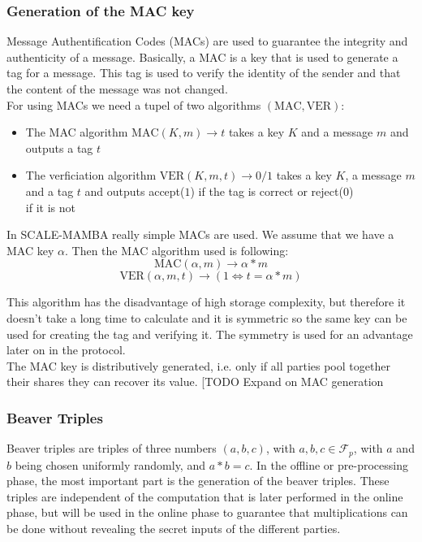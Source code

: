 \documentclass[english,runningheads,a4paper]{llncs}[2018/03/10]
\begin{document}
\subsubsection{Generation of the MAC key}
Message Authentification Codes (MACs) are used to guarantee the integrity and authenticity of a message. Basically, a MAC is a key that is used to generate a tag for a message. This tag is used to verify the identity of the sender and that the content of the message was not changed.\\
For using MACs we need a tupel of two algorithms \((\text{MAC},\text{VER})\):\\
\begin{itemize}
\item The MAC algorithm \(\text{MAC}(K,m)\rightarrow t\) takes a key \(K\) and a message \(m\) and outputs a tag \(t\)\\
\item The verficiation algorithm \(\text{VER}(K,m,t)\rightarrow 0/1\) takes a key \(K\), a message \(m\) and a tag \(t\) and outputs accept(\(1\)) if the tag is correct or reject(\(0\))\\ if it is not
\end{itemize}

In SCALE-MAMBA really simple MACs are used. We assume that we have a MAC key \( \alpha \). Then the MAC algorithm used is following:\\
$$\text{MAC}(\alpha,m)\rightarrow \alpha * m$$ 
$$\text{VER}(\alpha,m,t)\rightarrow (1 \Leftrightarrow t = \alpha*m) $$ 

This algorithm has the disadvantage of high storage complexity, but therefore it doesn't take a long time to calculate and it is symmetric so the same key can be used for creating the tag and verifying it. The symmetry is used for an advantage later on in the protocol.\\

The MAC key is distributively generated, i.e. only if all parties pool together their shares they can recover its value. 
[TODO Expand on MAC generation


\subsubsection{Beaver Triples}

Beaver triples are triples of three numbers \((a,b,c)\), with \( a,b,c\in \mathcal{F}_p \), with \(a\) and \(b\) being chosen uniformly randomly, and \(a*b=c\).
In the offline or pre-processing phase, the most important part is the generation of the beaver triples. These triples  are independent of the computation that is later performed in the online phase, but will be used in the online phase to guarantee that multiplications can be done without revealing the secret inputs of the different parties.\\
\end{document}
